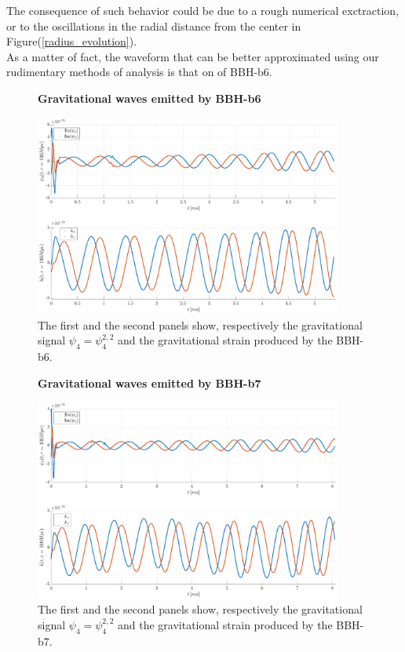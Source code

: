 The consequence of such behavior could be due to a rough numerical exctraction, or to the oscillations in the radial distance from the center in Figure(\ref{radius_evolution}).\\
As a matter of fact, the waveform that can be better approximated using our rudimentary methods of analysis is that on of BBH-b6.\par
\begin{figure}[H]
\centering
    \textbf{Gravitational waves emitted by BBH-b6}\par\medskip
\centering
\includegraphics[width=0.9\textwidth]{numerical_evolution/gw_b6.eps}
   \caption{The first and the second panels show, respectively the gravitational signal $\psi_4=\psi_4 ^{2,2}$ and the gravitational strain produced by the BBH-b6.}
      \label{gw_b6}
\end{figure}
   \begin{figure}[H]
\centering
    \textbf{Gravitational waves emitted by BBH-b7}\par\medskip
\centering
\includegraphics[width=0.9\textwidth]{numerical_evolution/gw_b7.eps}
\caption{The first and the second panels show, respectively the gravitational signal $\psi_4=\psi_4 ^{2,2}$ and the gravitational strain produced by the BBH-b7.}   
   \label{gw_b7}
   \end{figure}
